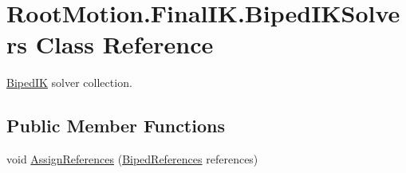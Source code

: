 \hypertarget{class_root_motion_1_1_final_i_k_1_1_biped_i_k_solvers}{}\section{Root\+Motion.\+Final\+I\+K.\+Biped\+I\+K\+Solvers Class Reference}
\label{class_root_motion_1_1_final_i_k_1_1_biped_i_k_solvers}


\mbox{\hyperlink{class_root_motion_1_1_final_i_k_1_1_biped_i_k}{Biped\+IK}} solver collection.  


\subsection*{Public Member Functions}
\begin{DoxyCompactItemize}
\item 
void \mbox{\hyperlink{class_root_motion_1_1_final_i_k_1_1_biped_i_k_solvers_abdda5a3c402e14305b58a90c82eefc49}{Assign\+References}} (\mbox{\hyperlink{class_root_motion_1_1_biped_references}{Biped\+References}} references)
\end{DoxyCompactItemize}
